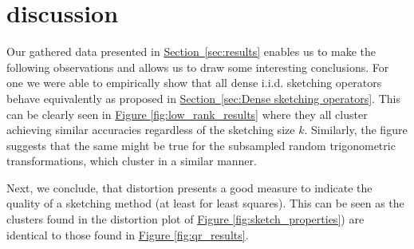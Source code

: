 \documentclass{article}
\begin{document}
\section{discussion}
Our gathered data presented in \hyperref[sec:results]{Section~\ref*{sec:results}} enables us to make the following observations and allows us to draw some interesting conclusions.
For one we were able to empirically show that all dense i.i.d. sketching operators behave equivalently as proposed in \hyperref[sec:Dense sketching operators]{Section~\ref*{sec:Dense sketching operators}}. This can be clearly seen in \hyperref[fig:low_rank_results]{Figure \ref*{fig:low_rank_results}} where they all cluster achieving similar accuracies regardless of the sketching size $k$. Similarly, the figure suggests that the same might be true for the subsampled random trigonometric transformations, which cluster in a similar manner. 

Next, we conclude, that distortion presents a good measure to indicate the quality of a sketching method (at least for least squares). This can be seen as the clusters found in the distortion plot of \hyperref[fig:sketch_properties]{Figure \ref*{fig:sketch_properties}}) are identical to those found in \hyperref[fig:qr_results]{Figure \ref*{fig:qr_results}}. 
\end{document}
